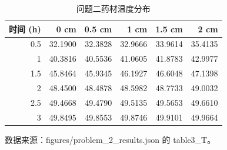 \begin{table}[H]
  \centering
  \caption{问题二药材温度分布}
  \label{tab:q2_T}
  \begin{tabular}{rrrrrr}
    \toprule
    时间 (h) & 0 cm & 0.5 cm & 1 cm & 1.5 cm & 2 cm \\
    \midrule
    0.5 & 32.1900 & 32.3828 & 32.9666 & 33.9614 & 35.4135 \\
    1 & 40.3816 & 40.5536 & 41.0605 & 41.8783 & 42.9977 \\
    1.5 & 45.8464 & 45.9345 & 46.1927 & 46.6048 & 47.1398 \\
    2 & 48.4500 & 48.4878 & 48.5982 & 48.7733 & 49.0032 \\
    2.5 & 49.4668 & 49.4790 & 49.5135 & 49.5653 & 49.6610 \\
    3 & 49.8495 & 49.8553 & 49.8746 & 49.9101 & 49.9664 \\
    \bottomrule
  \end{tabular}
  \par\vspace{2pt}\footnotesize 数据来源：figures/problem\_2\_results.json 的 table3\_T。
\end{table}
